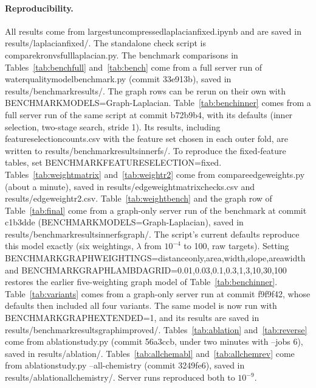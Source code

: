\documentclass[11pt]{article}
\newcommand{\codeus}{\textunderscore\allowbreak}
\newcommand{\code}[1]{{\ttfamily\let\_\codeus #1}}
\begin{document}
\paragraph{Reproducibility.} All results come from \code{largest\_uncompressed\_laplacian\_fixed.ipynb}
and are saved in \code{results/laplacian\_fixed/}. The standalone check script is
\code{compare\_kron\_vs\_full\_laplacian.py}. The benchmark comparisons in
Tables~\ref{tab:benchfull} and~\ref{tab:bench} come from a full server run of
\code{water\_quality\_model\_benchmark.py} (commit \code{33e913b}), saved in
\code{results/benchmark\_results/}. The graph rows can be rerun on their own with
\code{BENCHMARK\_MODELS=Graph-Laplacian}. Table~\ref{tab:benchinner} comes from a full server run of
the same script at commit \code{b72b9b4}, with its defaults (inner selection, two-stage search,
stride 1). Its results, including \code{feature\_selection\_counts.csv} with the feature set chosen in
each outer fold, are written to \code{results/benchmark\_results\_inner\_fs/}. To reproduce the
fixed-feature tables, set \code{BENCHMARK\_FEATURE\_SELECTION=fixed}. Tables~\ref{tab:weightmatrix}
and~\ref{tab:weightr2} come from \code{compare\_edge\_weights.py} (about a minute), saved in
\code{results/edge\_weight\_matrix\_checks.csv} and \code{results/edge\_weight\_r2.csv}.
Table~\ref{tab:weightbench} and the graph row of Table~\ref{tab:final} come from a graph-only server
run of the benchmark at commit \code{c1b3dde} (\code{BENCHMARK\_MODELS=Graph-Laplacian}), saved in
\code{results/benchmark\_results\_inner\_fs\_graph/}. The script's current defaults reproduce this
model exactly (six weightings, $\lambda$ from $10^{-4}$ to 100, raw targets). Setting
\code{BENCHMARK\_GRAPH\_WEIGHTINGS=distance\_only,area,width,slope,area\_width} and
\code{BENCHMARK\_GRAPH\_LAMBDA\_GRID=0.01,0.03,0.1,0.3,1,3,10,30,100} restores the earlier
five-weighting graph model of Table~\ref{tab:benchinner}. Table~\ref{tab:variants} comes from a
graph-only server run at commit \code{f9f9f42}, whose defaults then included all four variants. The
same model is now run with \code{BENCHMARK\_GRAPH\_EXTENDED=1}, and its results are saved in
\code{results/benchmark\_results\_graph\_improved/}. Tables~\ref{tab:ablation} and~\ref{tab:reverse} come from \code{ablation\_study.py}
(commit \code{56a3ccb}, under two minutes with \code{--jobs 6}), saved in
\code{results/ablation/}. Tables~\ref{tab:allchemabl} and~\ref{tab:allchemrev} come from
\code{ablation\_study.py --all-chemistry} (commit \code{3249fe6}), saved in
\code{results/ablation\_all\_chemistry/}. Server runs reproduced both to $10^{-9}$.
\end{document}
